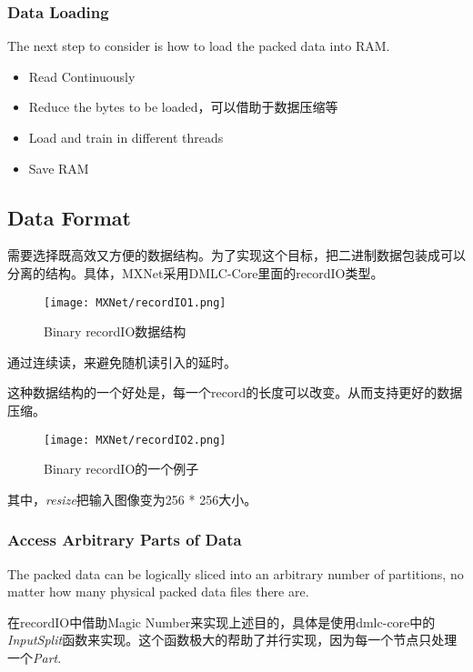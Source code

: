 \subsubsection{Data Loading}

The next step to consider is how to load the packed data into RAM. 

\begin{itemize}
\item Read Continuously
\item Reduce the bytes to be loaded，可以借助于数据压缩等
\item Load and train in different threads
\item Save RAM
\end{itemize}

\subsection{Data Format}

需要选择既高效又方便的数据结构。为了实现这个目标，把二进制数据包装成可以分离的结构。具体，MXNet采用DMLC-Core里面的recordIO类型。

\begin{figure}[!hbtp]
\centering
\texttt{[image: MXNet/recordIO1.png]}
\caption{Binary recordIO数据结构}
\label{recordIO1}
\end{figure}

通过连续读，来避免随机读引入的延时。

这种数据结构的一个好处是，每一个record的长度可以改变。从而支持更好的数据压缩。

\begin{figure}[!hbtp]
\centering
\texttt{[image: MXNet/recordIO2.png]}
\caption{Binary recordIO的一个例子}
\label{recordIO2}
\end{figure}
其中，\textit{resize}把输入图像变为256 * 256大小。


\subsubsection{Access Arbitrary Parts of Data}

The packed data can be logically sliced into an arbitrary number of partitions, no matter how many physical packed data files there are.

在recordIO中借助Magic Number来实现上述目的，具体是使用dmlc-core中的\textit{InputSplit}函数来实现。这个函数极大的帮助了并行实现，因为每一个节点只处理一个\textit{Part}.

